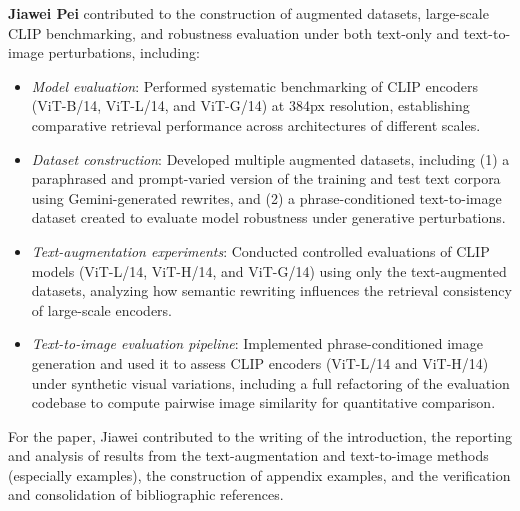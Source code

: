 \documentclass[11pt]{article}
\begin{document}
\textbf{Jiawei Pei} contributed to the construction of augmented datasets, large-scale CLIP benchmarking, and robustness evaluation under both text-only and text-to-image perturbations, including:
\begin{itemize}
    \item \textit{Model evaluation}: Performed systematic benchmarking of CLIP encoders (ViT-B/14, ViT-L/14, and ViT-G/14) at 384px resolution, establishing comparative retrieval performance across architectures of different scales.

    \item \textit{Dataset construction}: Developed multiple augmented datasets, including (1) a paraphrased and prompt-varied version of the training and test text corpora using Gemini-generated rewrites, and (2) a phrase-conditioned text-to-image dataset created to evaluate model robustness under generative perturbations.

    \item \textit{Text-augmentation experiments}: Conducted controlled evaluations of CLIP models (ViT-L/14, ViT-H/14, and ViT-G/14) using only the text-augmented datasets, analyzing how semantic rewriting influences the retrieval consistency of large-scale encoders.

    \item \textit{Text-to-image evaluation pipeline}: Implemented phrase-conditioned image generation and used it to assess CLIP encoders (ViT-L/14 and ViT-H/14) under synthetic visual variations, including a full refactoring of the evaluation codebase to compute pairwise image similarity for quantitative comparison.
\end{itemize}

For the paper, Jiawei contributed to the writing of the introduction, the reporting and analysis of results from the text-augmentation and text-to-image methods (especially examples), the construction of appendix examples, and the verification and consolidation of bibliographic references.
\end{document}
